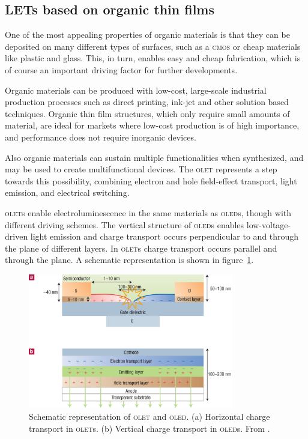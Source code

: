 \subsection{LETs based on organic thin films}\label{sec:thinfilms} %
One of the most appealing properties of organic materials is that they can be deposited on many different types of surfaces, such as a \textsc{cmos} or cheap materials like plastic and glass. This, in turn, enables easy and cheap fabrication, which is of course an important driving factor for further developments.

Organic materials can be produced with low-cost, large-scale industrial production processes such as direct printing, ink-jet and other solution based techniques. Organic thin film structures, which only require small amounts of material, are ideal for markets where low-cost production is of high importance, and performance does not require inorganic devices.

Also organic materials can sustain multiple functionalities when synthesized, and may be used to create multifunctional devices. The \textsc{olet} represents a step towards this possibility, combining electron and hole field-effect transport, light emission, and electrical switching.

\textsc{olet}s enable electroluminescence in the same materials as \textsc{oled}s, though with different driving schemes. The vertical structure of \textsc{oled}s enables low-voltage-driven light emission and charge transport occurs perpendicular to and through the plane of different layers. In \textsc{olet}s charge transport occurs parallel and through the plane. A schematic representation is shown in figure~\ref{fig:thinfilms}.

\begin{figure}[!ht]
 \begin{center}
  \includegraphics[width=0.8\textwidth]{fig_2}
  \caption{Schematic representation of \textsc{olet} and \textsc{oled}. (a) Horizontal charge transport in \textsc{olet}s. (b) Vertical charge transport in \textsc{oled}s. From \citet{Muccini}.}
  \label{fig:thinfilms}
 \end{center}
\end{figure}

